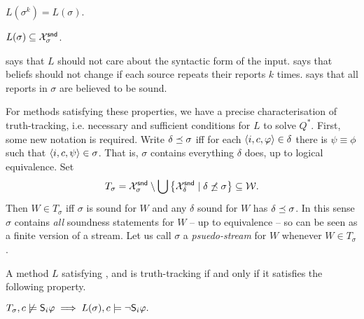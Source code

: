 \begin{axiom}[\repetition{}]
    $L(\sigma^k) = L(\sigma)$.
\end{axiom}

\begin{axiom}[\soundness{}]
    $L(\sigma) \subseteq \Xsnd_\sigma$.
\end{axiom}

\equivalence{} says that $L$ should not care about the syntactic form of the
input. \repetition{} says that beliefs should not change if each
source repeats their reports $k$ times. \soundness{} says that all reports in
$\sigma$ are believed to be sound.

For methods satisfying these properties, we have a precise characterisation of
truth-tracking, i.e. necessary and sufficient conditions for $L$ to solve
$Q^*$. First, some new notation is required. Write $\delta \seqss \sigma$ iff
for each $\tuple{i, c, \phi} \in \delta$ there is $\psi \equiv \phi$ such that
$\tuple{i, c, \psi} \in \sigma$. That is, $\sigma$ contains everything $\delta$
does, up to logical equivalence. Set
\[
    T_\sigma
    = \Xsnd_\sigma
        \setminus
        \bigcup\left\{
            \Xsnd_\delta
            \mid
            \delta \not\seqss \sigma\right
        \}
    \subseteq \worlds.
\]
Then $W \in T_\sigma$ iff $\sigma$ is sound for $W$ and any $\delta$ sound for
$W$ has $\delta \seqss \sigma$. In this sense $\sigma$ contains \emph{all}
soundness statements for $W$ -- up to equivalence -- so can be seen as a finite
version of a stream. Let us call $\sigma$ a \emph{psuedo-stream} for $W$
whenever $W \in T_\sigma$.

\begin{theorem}
    \label{thm_tt_characterisation}
    A method $L$ satisfying \equivalence{}, \repetition{} and \soundness{} is
    truth-tracking if and only if it satisfies the following property.
    \begin{axiom}[\credulity{}]
        $
        T_\sigma, c \not\models \S_i\phi
        \implies
        L(\sigma), c \models \neg\S_i\phi.
        $
    \end{axiom}

\end{theorem}

